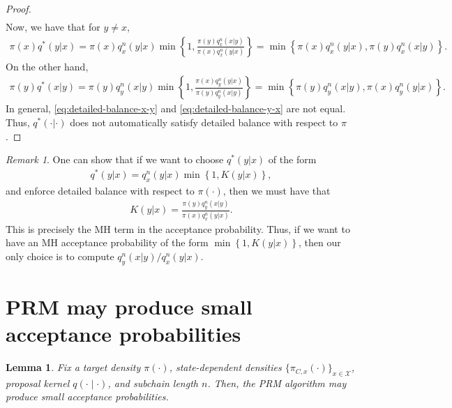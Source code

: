 \documentclass[12pt]{article}
\newtheorem{lemma}[theorem]{Lemma}
\theoremstyle{definition}
\theoremstyle{remark}
\newtheorem{remark}[theorem]{Remark}
\theoremstyle{plain}
\begin{document}
\begin{proof}
\begin{align}
  \nonumber
\end{align}
Now, we have that for $y \neq x$, 
\begin{align}
  \pi(x) q^*(y|x) 
  = \pi(x) q_x^n(y|x)\min\left\{1, \frac{\pi(y)q_x^n(x|y)}{\pi(x)q_x^n(y|x)}\right\}
  = \min\left\{\pi(x)q_x^n(y|x),\pi(y)q_x^n(x|y)\right\}. \label{eq:detailed-balance-x-y}
\end{align}
On the other hand, 
\begin{align}
  \pi(y) q^*(x|y) 
  = \pi(y) q_y^n(x|y)\min\left\{1, \frac{\pi(x)q_y^n(y|x)}{\pi(y)q_y^n(x|y)}\right\}
  = \min\left\{\pi(y)q_y^n(x|y),\pi(x)q_y^n(y|x)\right\}. \label{eq:detailed-balance-y-x}
\end{align}
In general, \eqref{eq:detailed-balance-x-y} and \eqref{eq:detailed-balance-y-x} are not equal. 
Thus, $q^*(\cdot|\cdot)$ does not automatically satisfy detailed balance with respect to $\pi$.
\end{proof}

\begin{remark}
  One can show that if we want to choose $q^*(y|x)$ of the form
  \begin{align}
    q^*(y|x) 
    = q_x^n(y|x)\min\left\{1, K(y|x)\right\}, \label{eq:q-star-form}
  \end{align}
  and enforce detailed balance with respect to $\pi(\cdot)$, then we must have that 
  \begin{align*}
    K(y|x) = \frac{\pi(y)q_y^n(x|y)}{\pi(x)q_x^n(y|x)}.
  \end{align*}
  This is precisely the MH term in the acceptance probability. 
  Thus, if we want to have an MH acceptance probability of the form $\min\left\{1, K(y|x)\right\}$, 
  then our only choice is to compute $q_y^n(x|y)/q_x^n(y|x)$.
\end{remark}


\section{PRM may produce small acceptance probabilities}

\begin{lemma} 
\label{lem:prm-low-acceptance}
Fix a target density $\pi(\cdot)$, state-dependent densities $\{\pi_{C,x}(\cdot)\}_{x \in \mathcal{X}}$, 
proposal kernel $q(\cdot\mid\cdot)$, and subchain length $n$. 
Then, the PRM algorithm may produce small acceptance probabilities.
\end{lemma}
\end{document}
